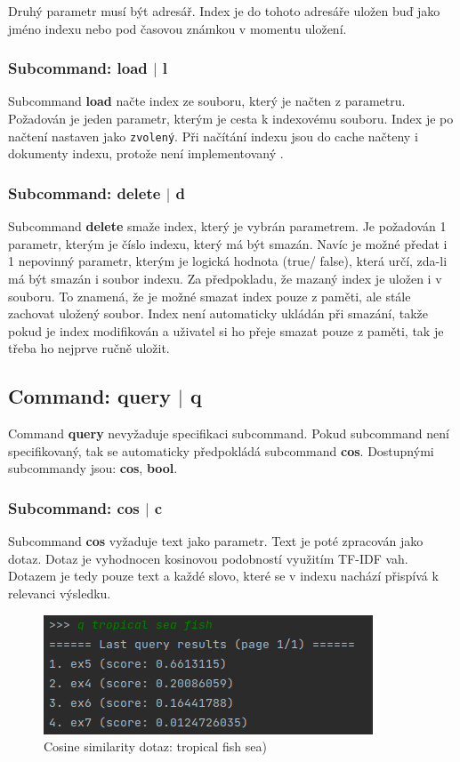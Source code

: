 \documentclass[12pt, letterpaper]{article}
\begin{document}
Druhý parametr musí být adresář. Index je do tohoto adresáře uložen buď jako jméno indexu nebo pod časovou známkou
v momentu uložení.
%
\subsubsection{Subcommand: load $|$ l}
Subcommand \textbf{load} načte index ze souboru, který je načten z parametru. Požadován je jeden parametr, kterým je
cesta k indexovému souboru. Index je po načtení nastaven jako \texttt{zvolený}. Při načítání indexu jsou do cache
načteny i dokumenty indexu, protože není implementovaný .
%
\subsubsection{Subcommand: delete $|$ d}
Subcommand \textbf{delete} smaže index, který je vybrán parametrem. Je požadován 1 parametr, kterým je číslo indexu,
který má být smazán. Navíc je možné předat i 1 nepovinný parametr, kterým je logická hodnota (true/ false), která
určí, zda-li má být smazán i soubor indexu. Za předpokladu, že mazaný index je uložen i v souboru. To znamená, že
je možné smazat index pouze z paměti, ale stále zachovat uložený soubor. Index není automaticky ukládán při smazání,
takže pokud  je index modifikován a uživatel si ho přeje smazat pouze z paměti, tak je třeba ho nejprve ručně uložit.
%
%
\subsection{Command: query $|$ q}
Command \textbf{query} nevyžaduje specifikaci subcommand. Pokud subcommand není specifikovaný, tak se automaticky předpokládá
subcommand \textbf{cos}. Dostupnými subcommandy jsou: \textbf{cos}, \textbf{bool}.
%
\subsubsection{Subcommand: cos $|$ c}
Subcommand \textbf{cos} vyžaduje text jako parametr. Text je poté zpracován jako dotaz. Dotaz je vyhodnocen
kosinovou podobností využitím TF-IDF vah. Dotazem je tedy pouze text a každé slovo, které se v indexu nachází
přispívá k relevanci výsledku.

\begin{figure}[H]
    \centering
    \includegraphics[width=\linewidth]{img/q_practice}
    \caption{Cosine similarity dotaz: tropical fish sea)}
    \label{fig:q_practice}
\end{figure}
%
\end{document}
